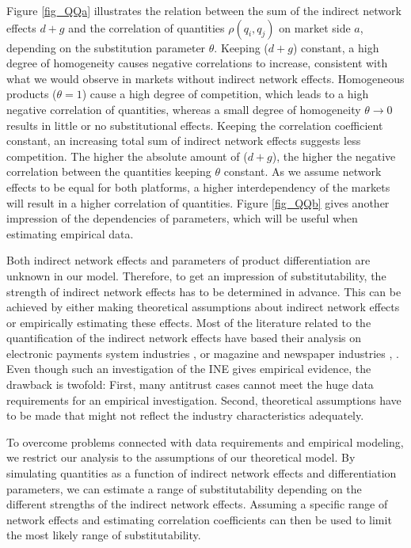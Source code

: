 \documentclass[12pt,a4paper,notitlepage]{article}
\begin{document}
Figure \ref{fig_QQa} illustrates the relation between the sum of the indirect network effects $d+g$ and the correlation of quantities $\rho(q_i,q_j)$ on market side $a$, depending on the substitution parameter $\theta$. Keeping ($d+g$) constant, a high degree of homogeneity causes negative correlations to increase, consistent with what we would observe in markets without indirect network effects. Homogeneous products ($\theta=1$) cause a high degree of competition, which leads to a high negative correlation of quantities, whereas a small degree of homogeneity $\theta \to 0$ results in little or no substitutional effects. Keeping the correlation coefficient constant, an increasing total sum of indirect network effects suggests less competition. The higher the absolute amount of ($d+g$), the higher the negative correlation between the quantities keeping $\theta$ constant. As we assume network effects to be equal for both platforms, a higher interdependency of the markets will result in a higher correlation of quantities. Figure \ref{fig_QQb} gives another impression of the dependencies of parameters, which will be useful when estimating empirical data.

Both indirect network effects and parameters of product differentiation are unknown in our model. Therefore, to get an impression of substitutability, the strength of indirect network effects has to be determined in advance. This can be achieved by either making theoretical assumptions about indirect network effects or empirically estimating these effects. Most of the literature related to the quantification of the indirect network effects have based their analysis on electronic payments system industries \citep{ackerberg_quantifying_2006}, \citep{rysman_empirical_2007} or magazine and newspaper industries \citep{kaiser_price_2006}, \citep{argentesi_estimating_2007}. Even though such an investigation of the INE gives empirical evidence, the drawback is twofold: First, many antitrust cases cannot meet the huge data requirements for an empirical investigation. Second, theoretical assumptions have to be made that might not reflect the industry characteristics adequately. 

To overcome problems connected with data requirements and empirical modeling, we restrict our analysis to the assumptions of our theoretical model. By simulating quantities as a function of indirect network effects and differentiation parameters, we can estimate a range of substitutability depending on the different strengths of the indirect network effects. Assuming a specific range of network effects and estimating correlation coefficients can then be used to limit the most likely range of substitutability.  
\end{document}
